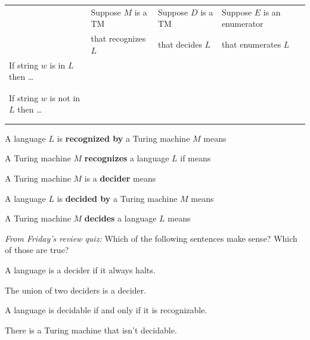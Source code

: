 \documentclass[12pt, oneside]{article}
\begin{document}
\begin{center}
    \begin{tabular}{|l|l|l|l|}
    \hline
    & Suppose $M$ is  a TM & Suppose $D$ is  a TM & Suppose $E$ is  an
    enumerator  \\
    &that  recognizes $L$  &that  decides $L$  &that enumerates $L$ \\
    \hline
    If string $w$ is in  $L$ then  \ldots  &&& \\
    &&&\\
    &&&\\
    If string $w$ is not in  $L$ then  \ldots  && &\\
    &&&\\
    &&&\\
    \hline
    \end{tabular}
\end{center}


A language $L$ is {\bf recognized by} a Turing machine $M$ means

\vspace{15pt}

A Turing  machine  $M$ {\bf  recognizes} a language $L$ if means

\vspace{15pt}

A Turing machine $M$ is a {\bf decider}  means

\vspace{15pt}

A language  $L$ is {\bf decided by} a Turing  machine  $M$  means

\vspace{15pt}

A  Turing machine $M$ {\bf decides} a language $L$ means

\vspace{15pt}


{\it From Friday's review quiz: }
Which of the following sentences make sense? Which of those are true?

A language is a decider if it always halts.

\vfill

The union of two deciders is a decider.

\vfill

A language is decidable if and only if it is recognizable.

\vfill

There is a Turing machine that isn't decidable.

\vfill
\end{document}
